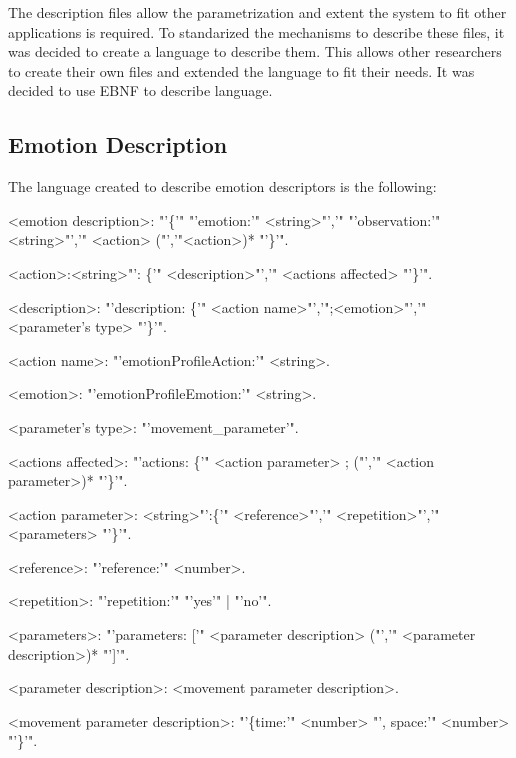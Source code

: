 The description files allow the parametrization and extent the system to fit other applications is required. To standarized the mechanisms to describe these files, it was decided to create a language to describe them. This allows other researchers to create their own files and extended the language to fit their needs. It was decided to use EBNF to describe language.
\subsection{Emotion Description} 
The language created to describe emotion descriptors is the following:
\begin{small}

\begingrammar
%		
<emotion description>: "'\{'" "'emotion:'" <string>"','" "'observation:'" <string>"','" <action> ("','"<action>)* "'\}'".

<action>:<string>"': \{'" <description>"','" <actions affected> "'\}'".

<description>: "'description: \{'" <action name>"','";<emotion>"','" <parameter's type> "'\}'".

<action name>: "'emotionProfileAction:'" <string>.

<emotion>: "'emotionProfileEmotion:'" <string>.

<parameter's type>: "'movement\_parameter'".

<actions affected>: "'actions: \{'" <action parameter> ; ("','" <action parameter>)* "'\}'".

<action parameter>: <string>"':\{'" <reference>"','" <repetition>"','" <parameters> "'\}'".

<reference>: "'reference:'" <number>.

<repetition>: "'repetition:'" "'yes'" | "'no'".

<parameters>: "'parameters: ['" <parameter description> ("','" <parameter description>)* "']'".

<parameter description>: <movement parameter description>.

<movement parameter description>: "'\{time:'" <number> "', space:'" <number> "'\}'".

\endgrammar
\end{small}

